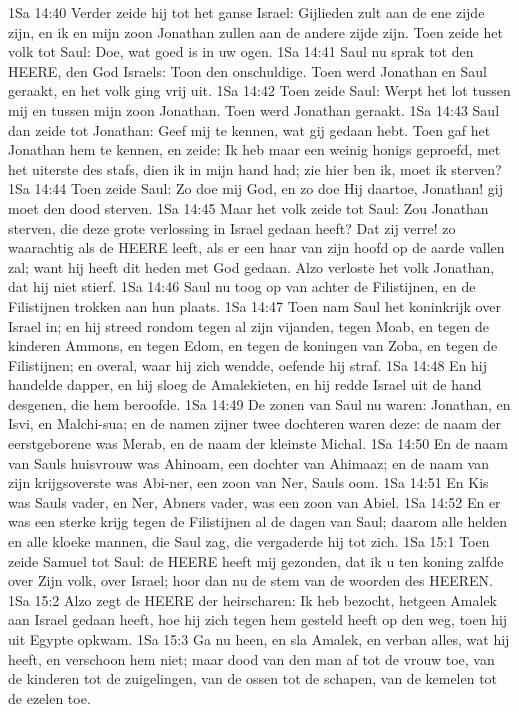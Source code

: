 1Sa 14:40  Verder zeide hij tot het ganse Israel: Gijlieden zult aan de ene zijde zijn, en ik en mijn zoon Jonathan zullen aan de andere zijde zijn. Toen zeide het volk tot Saul: Doe, wat goed is in uw ogen.
1Sa 14:41  Saul nu sprak tot den HEERE, den God Israels: Toon den onschuldige. Toen werd Jonathan en Saul geraakt, en het volk ging vrij uit.
1Sa 14:42  Toen zeide Saul: Werpt het lot tussen mij en tussen mijn zoon Jonathan. Toen werd Jonathan geraakt.
1Sa 14:43  Saul dan zeide tot Jonathan: Geef mij te kennen, wat gij gedaan hebt. Toen gaf het Jonathan hem te kennen, en zeide: Ik heb maar een weinig honigs geproefd, met het uiterste des stafs, dien ik in mijn hand had; zie hier ben ik, moet ik sterven?
1Sa 14:44  Toen zeide Saul: Zo doe mij God, en zo doe Hij daartoe, Jonathan! gij moet den dood sterven.
1Sa 14:45  Maar het volk zeide tot Saul: Zou Jonathan sterven, die deze grote verlossing in Israel gedaan heeft? Dat zij verre! zo waarachtig als de HEERE leeft, als er een haar van zijn hoofd op de aarde vallen zal; want hij heeft dit heden met God gedaan. Alzo verloste het volk Jonathan, dat hij niet stierf.
1Sa 14:46  Saul nu toog op van achter de Filistijnen, en de Filistijnen trokken aan hun plaats.
1Sa 14:47  Toen nam Saul het koninkrijk over Israel in; en hij streed rondom tegen al zijn vijanden, tegen Moab, en tegen de kinderen Ammons, en tegen Edom, en tegen de koningen van Zoba, en tegen de Filistijnen; en overal, waar hij zich wendde, oefende hij straf.
1Sa 14:48  En hij handelde dapper, en hij sloeg de Amalekieten, en hij redde Israel uit de hand desgenen, die hem beroofde.
1Sa 14:49  De zonen van Saul nu waren: Jonathan, en Isvi, en Malchi-sua; en de namen zijner twee dochteren waren deze: de naam der eerstgeborene was Merab, en de naam der kleinste Michal.
1Sa 14:50  En de naam van Sauls huisvrouw was Ahinoam, een dochter van Ahimaaz; en de naam van zijn krijgsoverste was Abi-ner, een zoon van Ner, Sauls oom.
1Sa 14:51  En Kis was Sauls vader, en Ner, Abners vader, was een zoon van Abiel.
1Sa 14:52  En er was een sterke krijg tegen de Filistijnen al de dagen van Saul; daarom alle helden en alle kloeke mannen, die Saul zag, die vergaderde hij tot zich.
1Sa 15:1  Toen zeide Samuel tot Saul: de HEERE heeft mij gezonden, dat ik u ten koning zalfde over Zijn volk, over Israel; hoor dan nu de stem van de woorden des HEEREN.
1Sa 15:2  Alzo zegt de HEERE der heirscharen: Ik heb bezocht, hetgeen Amalek aan Israel gedaan heeft, hoe hij zich tegen hem gesteld heeft op den weg, toen hij uit Egypte opkwam.
1Sa 15:3  Ga nu heen, en sla Amalek, en verban alles, wat hij heeft, en verschoon hem niet; maar dood van den man af tot de vrouw toe, van de kinderen tot de zuigelingen, van de ossen tot de schapen, van de kemelen tot de ezelen toe.
